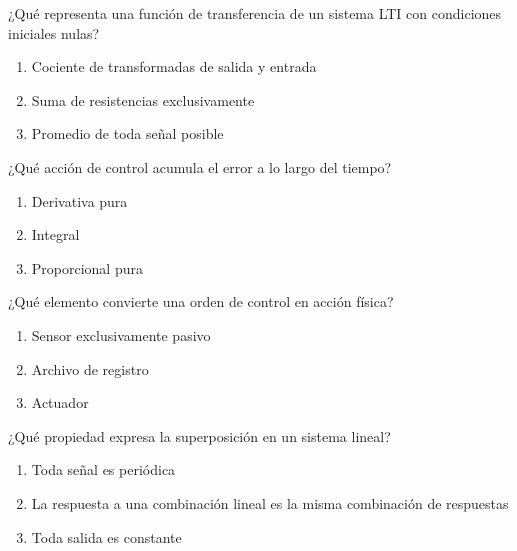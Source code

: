 \noindent\begin{minipage}{\linewidth}\setlength{\parskip}{4pt}\label{q:H-074}
¿Qué representa una función de transferencia de un sistema LTI con condiciones iniciales nulas?
\begin{enumerate}[label=\Alph*),nosep]
\item Cociente de transformadas de salida y entrada
\item Suma de resistencias exclusivamente
\item Promedio de toda señal posible
\end{enumerate}\end{minipage}\par\medskip

\noindent\begin{minipage}{\linewidth}\setlength{\parskip}{4pt}\label{q:H-075}
¿Qué acción de control acumula el error a lo largo del tiempo?
\begin{enumerate}[label=\Alph*),nosep]
\item Derivativa pura
\item Integral
\item Proporcional pura
\end{enumerate}\end{minipage}\par\medskip

\noindent\begin{minipage}{\linewidth}\setlength{\parskip}{4pt}\label{q:H-076}
¿Qué elemento convierte una orden de control en acción física?
\begin{enumerate}[label=\Alph*),nosep]
\item Sensor exclusivamente pasivo
\item Archivo de registro
\item Actuador
\end{enumerate}\end{minipage}\par\medskip

\noindent\begin{minipage}{\linewidth}\setlength{\parskip}{4pt}\label{q:H-077}
¿Qué propiedad expresa la superposición en un sistema lineal?
\begin{enumerate}[label=\Alph*),nosep]
\item Toda señal es periódica
\item La respuesta a una combinación lineal es la misma combinación de respuestas
\item Toda salida es constante
\end{enumerate}\end{minipage}\par\medskip


